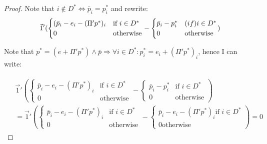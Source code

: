 \documentclass[12pt,a4paper]{article}
\begin{document}
\begin{proof}
Note that $i\notin D^*\Leftrightarrow \bar{p}_i=p_i^*$ and rewrite:
\[
\vec{1}' (
\begin{cases}
(\bar{p}_i-e_i-(\Pi' p^* )_i  &\mbox{if } i\in D^*  \\
0 &\mbox{otherwise}
\end{cases}
-
\begin{cases}
\bar{p}_i-p_i^*  &\mbox(if ) i \in D^* \\
0 &\mbox{otherwise}
\end{cases}
)
\]


Note that $p^*=(e+\Pi' p^* ) \wedge \bar{p} \Rightarrow \forall i \in D^* \colon p_i^*=e_i+(\Pi' p^* )_i$, hence I can write:

\begin{align*}
\begin{split}
& \vec{1}'(
\begin{cases}
\bar{p}_i-e_i-(\Pi' p^* )_i  &\mbox{if } i\in D^*  \\
0 &\mbox{otherwise}
\end{cases}
-
\begin{cases}
\bar{p}_i-p_i^*  &\mbox{if } i\in D^*  \\
0 &\mbox{otherwise}
\end{cases}
)
\\ 
& =\vec{1}'(
\begin{cases}
\bar{p}_i-e_i-(\Pi' p^* )_i  &\mbox{if } i\in D^*  \\
0 &\mbox{otherwise}
\end{cases}
-
\begin{cases}
\bar{p}_i-e_i-(\Pi' p^* )_i  \mbox{if } i\in D^* \\
0 \mbox{otherwise }
\end{cases}
)=0
\end{split}
\end{align*}

\end{proof}
\end{document}

